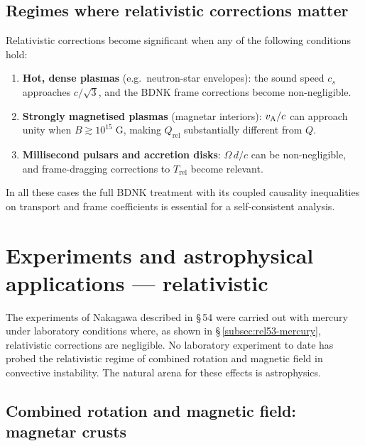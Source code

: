 \subsection{Regimes where relativistic corrections matter}

Relativistic corrections become significant when any of the following
conditions hold:
\begin{enumerate}
  \item \textbf{Hot, dense plasmas} (e.g.\ neutron-star envelopes):
    the sound speed $c_s$ approaches $c/\!\sqrt{3}$, and the BDNK
    frame corrections become non-negligible.
  \item \textbf{Strongly magnetised plasmas} (magnetar interiors):
    $v_{\mathrm{A}}/c$ can approach unity when $B\gtrsim 10^{15}\;\mathrm{G}$,
    making $Q_{\mathrm{rel}}$ substantially different from $Q$.
  \item \textbf{Millisecond pulsars and accretion disks}:
    $\Omega\,d/c$ can be non-negligible, and frame-dragging corrections
    to $T_{\mathrm{rel}}$ become relevant.
\end{enumerate}
In all these cases the full BDNK treatment with its coupled causality
inequalities on transport and frame coefficients
\citep{BemficaDN2018,Kovtun2019,BemficaDNK2023} is
essential for a self-consistent analysis.


\section{Experiments and astrophysical applications --- relativistic}\label{sec:rel-54}

The experiments of Nakagawa described in \S\,54 were carried out with
mercury under laboratory conditions where, as shown in
\S\,\ref{subsec:rel53-mercury}, relativistic corrections are negligible.
No laboratory experiment to date has probed the relativistic regime of
combined rotation and magnetic field in convective instability.  The
natural arena for these effects is astrophysics.

\subsection{Combined rotation and magnetic field: magnetar crusts}

